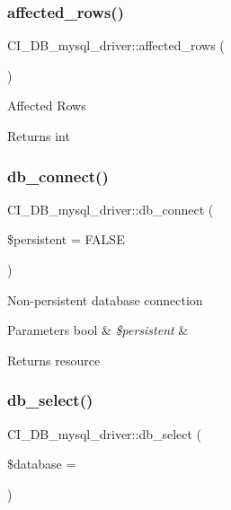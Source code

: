 \subsubsection{\texorpdfstring{affected\+\_\+rows()}{affected\_rows()}}
{\footnotesize\ttfamily C\+I\+\_\+\+D\+B\+\_\+mysql\+\_\+driver\+::affected\+\_\+rows (\begin{DoxyParamCaption}{ }\end{DoxyParamCaption})}

Affected Rows

\begin{DoxyReturn}{Returns}
int 
\end{DoxyReturn}
\mbox{\label{class_c_i___d_b__mysql__driver_a801b5e005b7b0ba495dfb03404226b36}} 
\subsubsection{\texorpdfstring{db\+\_\+connect()}{db\_connect()}}
{\footnotesize\ttfamily C\+I\+\_\+\+D\+B\+\_\+mysql\+\_\+driver\+::db\+\_\+connect (\begin{DoxyParamCaption}\item[{}]{\$persistent = {\ttfamily FALSE} }\end{DoxyParamCaption})}

Non-\/persistent database connection


\begin{DoxyParams}[1]{Parameters}
bool & {\em \$persistent} & \\
\hline
\end{DoxyParams}
\begin{DoxyReturn}{Returns}
resource 
\end{DoxyReturn}
\mbox{\label{class_c_i___d_b__mysql__driver_a578463fcc5c1123c0886e2c5271dd202}} 
\subsubsection{\texorpdfstring{db\+\_\+select()}{db\_select()}}
{\footnotesize\ttfamily C\+I\+\_\+\+D\+B\+\_\+mysql\+\_\+driver\+::db\+\_\+select (\begin{DoxyParamCaption}\item[{}]{\$database = {\ttfamily \textquotesingle{}\textquotesingle{}} }\end{DoxyParamCaption})}

